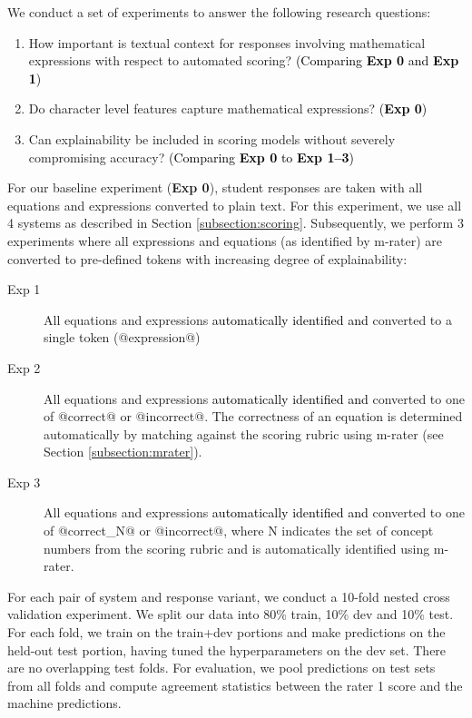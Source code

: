 \documentclass[11pt,a4paper]{article}
\newcommand{\AC}{\textcolor{black}} %
\begin{document}
We conduct a set of experiments to answer the following research questions: 
\begin{enumerate}
\item How important is textual context for responses involving mathematical expressions with respect to automated scoring? \AC{(Comparing {\bf Exp 0} and {\bf Exp 1})}
\item Do character level features capture mathematical expressions? \AC{({\bf Exp 0})}
\item Can explainability be included in scoring models without severely compromising accuracy? \AC{(Comparing {\bf Exp 0} to {\bf Exp 1--3})}
\end{enumerate}

For our baseline experiment (\textbf{Exp 0}), student responses are taken with all equations and expressions converted to plain text. For this experiment, we use all 4 systems as described in Section \ref{subsection:scoring}. Subsequently, we perform 3 experiments where all expressions and equations (as identified by m-rater) are converted to pre-defined tokens with increasing degree of explainability:


\begin{description}
\item [Exp 1] All equations and expressions \AC{automatically identified and} converted to a single token (@expression@)
\item [Exp 2] All equations and expressions \AC{automatically identified and} converted to one of @correct@ or @incorrect@. The correctness of an equation is determined automatically by matching against the scoring rubric using m-rater (see Section \ref{subsection:mrater}).
\item [Exp 3] All equations and expressions \AC{automatically identified and} converted to one of @correct\_N@ or @incorrect@, where N indicates the set of concept numbers from the scoring rubric and is automatically identified using m-rater. 
\end{description}

For each pair of system and response variant, we conduct a 10-fold nested cross validation experiment. We split our data into 80\% train, 10\% dev and 10\% test. 
For each fold, we train on the train+dev portions and make predictions on the held-out test portion, having tuned the hyperparameters on the dev set. There are no overlapping test folds. For evaluation, we pool predictions on test sets from all folds and compute agreement statistics between the rater 1 score and the machine predictions. 
\end{document}
